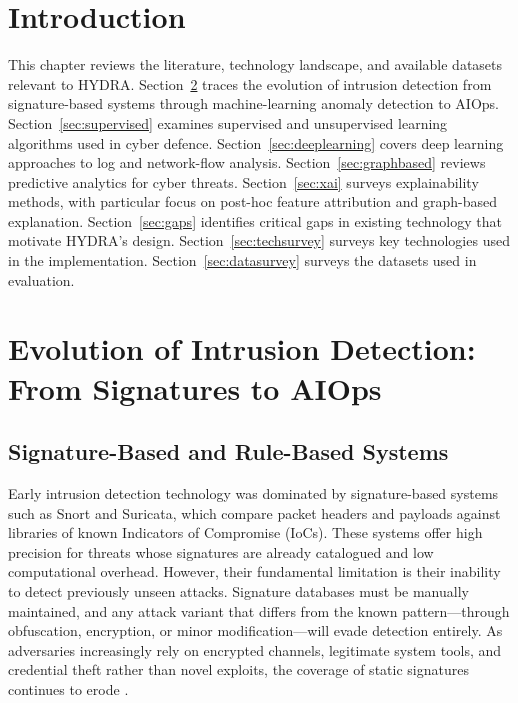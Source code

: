 \documentclass[12pt,a4paper]{report}
\begin{document}
\section{Introduction}
\label{sec:lit-intro}

This chapter reviews the literature, technology landscape, and available datasets relevant to HYDRA. Section~\ref{sec:evolution} traces the evolution of intrusion detection from signature-based systems through machine-learning anomaly detection to AIOps. Section~\ref{sec:supervised} examines supervised and unsupervised learning algorithms used in cyber defence. Section~\ref{sec:deeplearning} covers deep learning approaches to log and network-flow analysis. Section~\ref{sec:graphbased} reviews predictive analytics for cyber threats. Section~\ref{sec:xai} surveys explainability methods, with particular focus on post-hoc feature attribution and graph-based explanation. Section~\ref{sec:gaps} identifies critical gaps in existing technology that motivate HYDRA's design. Section~\ref{sec:techsurvey} surveys key technologies used in the implementation. Section~\ref{sec:datasurvey} surveys the datasets used in evaluation.

\section{Evolution of Intrusion Detection: From Signatures to AIOps}
\label{sec:evolution}

\subsection{Signature-Based and Rule-Based Systems}
\label{sec:signature}

Early intrusion detection technology was dominated by signature-based systems such as Snort and Suricata, which compare packet headers and payloads against libraries of known Indicators of Compromise (IoCs). These systems offer high precision for threats whose signatures are already catalogued and low computational overhead. However, their fundamental limitation is their inability to detect previously unseen attacks. Signature databases must be manually maintained, and any attack variant that differs from the known pattern---through obfuscation, encryption, or minor modification---will evade detection entirely. As adversaries increasingly rely on encrypted channels, legitimate system tools, and credential theft rather than novel exploits, the coverage of static signatures continues to erode \citep{ahmad2021}.
\end{document}
